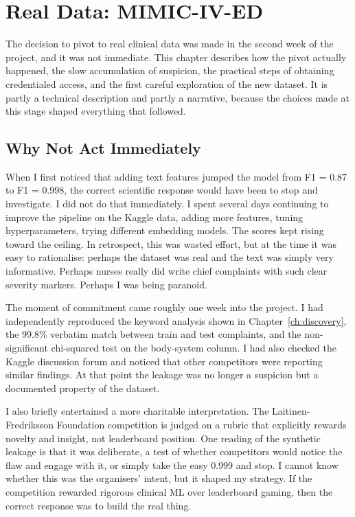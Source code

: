 
\chapter{Real Data: MIMIC-IV-ED}
\label{ch:mimic}

The decision to pivot to real clinical data was made in the second week of the project, and it was not immediate. This chapter describes how the pivot actually happened, the slow accumulation of suspicion, the practical steps of obtaining credentialed access, and the first careful exploration of the new dataset. It is partly a technical description and partly a narrative, because the choices made at this stage shaped everything that followed.

\section{Why Not Act Immediately}

When I first noticed that adding text features jumped the model from F1 = 0.87 to F1 = 0.998, the correct scientific response would have been to stop and investigate. I did not do that immediately. I spent several days continuing to improve the pipeline on the Kaggle data, adding more features, tuning hyperparameters, trying different embedding models. The scores kept rising toward the ceiling. In retrospect, this was wasted effort, but at the time it was easy to rationalise: perhaps the dataset was real and the text was simply very informative. Perhaps nurses really did write chief complaints with such clear severity markers. Perhaps I was being paranoid.

The moment of commitment came roughly one week into the project. I had independently reproduced the keyword analysis shown in Chapter~\ref{ch:discovery}, the 99.8\% verbatim match between train and test complaints, and the non-significant chi-squared test on the body-system column. I had also checked the Kaggle discussion forum and noticed that other competitors were reporting similar findings. At that point the leakage was no longer a suspicion but a documented property of the dataset.

I also briefly entertained a more charitable interpretation. The Laitinen-Fredriksson Foundation competition is judged on a rubric that explicitly rewards novelty and insight, not leaderboard position. One reading of the synthetic leakage is that it was deliberate, a test of whether competitors would notice the flaw and engage with it, or simply take the easy 0.999 and stop. I cannot know whether this was the organisers' intent, but it shaped my strategy. If the competition rewarded rigorous clinical ML over leaderboard gaming, then the correct response was to build the real thing.

